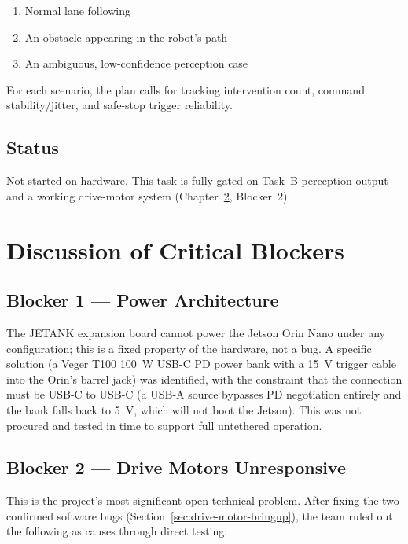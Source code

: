 \documentclass{imc-inf}
\begin{document}
\begin{enumerate}
\item Normal lane following
\item An obstacle appearing in the robot's path
\item An ambiguous, low-confidence perception case
\end{enumerate}

For each scenario, the plan calls for tracking intervention count, command
stability/jitter, and safe-stop trigger reliability.

\section{Status}
\label{sec:task-a-status}

Not started on hardware. This task is fully gated on Task~B perception output and
a working drive-motor system (Chapter~\ref{chap:discussion}, Blocker~2).

\chapter{Discussion of Critical Blockers}
\label{chap:discussion}

\section{Blocker 1 --- Power Architecture}
\label{sec:blocker1}

The JETANK expansion board cannot power the Jetson Orin Nano under any configuration;
this is a fixed property of the hardware, not a bug. A specific solution (a
Veger T100 100~W USB-C PD power bank with a 15~V trigger cable into the Orin's
barrel jack) was identified, with the constraint that the connection must be
USB-C to USB-C (a USB-A source bypasses PD negotiation entirely and the bank falls
back to 5~V, which will not boot the Jetson). This was not procured and tested in
time to support full untethered operation.

\section{Blocker 2 --- Drive Motors Unresponsive}
\label{sec:blocker2}

This is the project's most significant open technical problem. After fixing the two
confirmed software bugs (Section~\ref{sec:drive-motor-bringup}), the team ruled out
the following as causes through direct testing:
\end{document}
